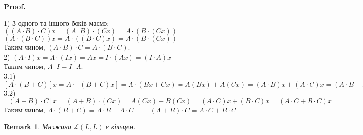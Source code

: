 \documentclass[a4paper, 10pt]{article}
\makeatletter
\def\qed{$\blacksquare$}
\theoremstyle{theoremdd}
\theoremstyle{theoremdd}
\theoremstyle{theoremdd}
\theoremstyle{theoremdd}
\theoremstyle{theoremdd}
\theoremstyle{theoremdd}
\newtheorem{remark}[theorem]{Remark}
\theoremstyle{theoremdd}
\theoremstyle{theoremdd}
\renewenvironment{proof}[1][Proof.\\]{\par
\pushQED{\hfill \qed}%
\normalfont \topsep6\p@\@plus6\p@\relax
\trivlist
\item\relax
{\bfseries
#1\@addpunct{.}}\hspace\labelsep\ignorespaces
}{%
\popQED\endtrivlist\@endpefalse
}
\makeatother
\begin{document}
	\begin{proof}
	1) З одного та іншого боків маємо:\\
	$((A \cdot B) \cdot C) x = (A \cdot B) \cdot (Cx) = A \cdot (B \cdot (Cx))$\\
	$(A \cdot (B \cdot C)) x = A \cdot ( (B \cdot C) x) = A \cdot (B \cdot (Cx))$\\
	Таким чином, $(A \cdot B) \cdot C = A \cdot (B \cdot C)$.
	\bigskip \\
	2) $(A \cdot I) x = A \cdot (Ix) = A x = I \cdot (A x) = (I \cdot A) x$\\
	Таким чином, $A \cdot I = I \cdot A$.
	\bigskip \\
	3.1) $[A \cdot (B + C)]x = A \cdot [(B+C)x] = A \cdot (Bx + Cx) = A (Bx) + A (Cx) = (A \cdot B)x + (A \cdot C)x = (A \cdot B + A \cdot C)x$\\
	3.2) $[(A+B) \cdot C]x = (A+B) \cdot (Cx) = A (Cx) + B (Cx) = (A \cdot C)x + (B \cdot C)x = (A \cdot C + B \cdot C)x$\\
	Таким чином, $A \cdot (B+C) = A \cdot B + A \cdot C \hspace{1cm} (A+B) \cdot C = A \cdot C + B \cdot C$.
	\end{proof}
	
	\begin{remark}
	Множина $\mathcal{L}(L,L)$ є кільцем.
	\end{remark}
	
\end{document}
